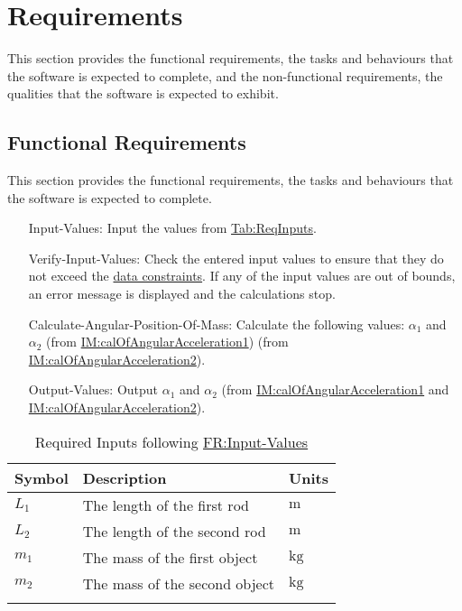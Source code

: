 \documentclass[12pt]{article}
\begin{document}
\section{Requirements}
\label{Sec:Requirements}
This section provides the functional requirements, the tasks and behaviours that the software is expected to complete, and the non-functional requirements, the qualities that the software is expected to exhibit.

\subsection{Functional Requirements}
\label{Sec:FRs}
This section provides the functional requirements, the tasks and behaviours that the software is expected to complete.

\begin{itemize}
\item[Input-Values:\phantomsection\label{inputValues}]{Input the values from \hyperref[Table:ReqInputs]{Tab:ReqInputs}.}
\item[Verify-Input-Values:\phantomsection\label{verifyInptVals}]{Check the entered input values to ensure that they do not exceed the \hyperref[Sec:DataConstraints]{data constraints}. If any of the input values are out of bounds, an error message is displayed and the calculations stop.}
\item[Calculate-Angular-Position-Of-Mass:\phantomsection\label{calcAngPos}]{Calculate the following values: ${α_{1}}$ and ${α_{2}}$ (from \hyperref[IM:calOfAngularAcceleration1]{IM:calOfAngularAcceleration1}) (from \hyperref[IM:calOfAngularAcceleration2]{IM:calOfAngularAcceleration2}).}
\item[Output-Values:\phantomsection\label{outputValues}]{Output ${α_{1}}$ and ${α_{2}}$ (from \hyperref[IM:calOfAngularAcceleration1]{IM:calOfAngularAcceleration1} and \hyperref[IM:calOfAngularAcceleration2]{IM:calOfAngularAcceleration2}).}
\end{itemize}
\begin{longtable}{l l l}
\toprule
\textbf{Symbol} & \textbf{Description} & \textbf{Units}
\\
\midrule
\endhead
${L_{1}}$ & The length of the first rod & ${\text{m}}$
\\
${L_{2}}$ & The length of the second rod & ${\text{m}}$
\\
${m_{1}}$ & The mass of the first object & ${\text{kg}}$
\\
${m_{2}}$ & The mass of the second object & ${\text{kg}}$
\\
\bottomrule
\caption{Required Inputs following \hyperref[inputValues]{FR:Input-Values}}
\label{Table:ReqInputs}
\end{longtable}
\end{document}
